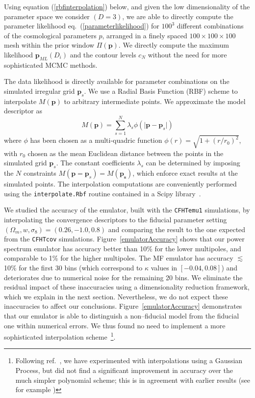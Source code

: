 \documentclass[reprint,aps,prd,superscriptaddress,showkeys,showpacs]{revtex4-1}
\begin{document}
Using equation (\ref{rbfinterpolation}) below, and given the low
dimensionality of the parameter space we consider $(D=3)$, we are able
to directly compute the parameter likelihood
eq.~(\ref{parameterlikelihood}) for $100^3$ different combinations of
the cosmological parameters $p$, arranged in a finely spaced
$100\times100\times100$ mesh within the prior window
$\Pi(\mathbf{p})$. We directly compute the maximum likelihood
$\mathbf{p}_{ML}(D_i)$ and the contour levels $c_N$ without the need
for more sophisticated MCMC methods.

The data likelihood is directly available for parameter combinations
on the simulated irregular grid $\mathbf{p}_s$.  We use a Radial Basis
Function (RBF) scheme to interpolate $M(\mathbf{p})$ to arbitrary
intermediate points.  We approximate the model descriptor as
\begin{equation}
\label{rbfinterpolation}
M(\mathbf{p}) = \sum_{s=1}^N \lambda_s\phi(\vert\mathbf{p}-\mathbf{p}_s\vert)
\end{equation}
%
where $\phi$ has been chosen as a multi-quadric function
$\phi(r)=\sqrt{1+(r/r_0)^2}$, with $r_0$ chosen as the mean Euclidean
distance between the points in the simulated grid $\mathbf{p}_s$. The
constant coefficients $\lambda_s$ can be determined by imposing the
$N$ constraints $M(\mathbf{p}=\mathbf{p}_s)=M(\mathbf{p_s})$, which
enforce exact results at the simulated points. The interpolation
computations are conveniently performed using the
\texttt{interpolate.Rbf} routine contained in a Scipy library~\citep{scipy}.

We studied the accuracy of the emulator, built with the
\texttt{CFHTemu1} simulations, by interpolating the convergence
descriptors to the fiducial parameter setting
$(\Omega_m,w,\sigma_8)=(0.26,-1.0,0.8)$ and comparing the result to
the one expected from the \texttt{CFHTcov}
simulations. Figure~\ref{emulatorAccuracy} shows that our power
spectrum emulator has accuracy better than 10\% for the lower
multipoles, and comparable to 1\% for the higher multipoles. The MF
emulator has accuracy $\lesssim$10\% for the first 30 bins (which
correspond to $\kappa$ values in $[-0.04,0.08]$) and deteriorates due
to numerical noise for the remaining 20 bins. We eliminate the
residual impact of these inaccuracies using a dimensionality reduction
framework, which we explain in the next section. Nevertheless, we do
not expect these inaccuracies to affect our
conclusions. Figure~\ref{emulatorAccuracy} demonstrates that our
emulator is able to distinguish a non--fiducial model from the
fiducial one within numerical errors.  We thus found no need to
implement a more sophisticated interpolation
scheme~\footnote{Following ref.~\citep{coyote2}, we have experimented
  with interpolations using a Gaussian Process, but did not find a
  significant improvement in accuracy over the much simpler polynomial
  scheme; this is in agreement with earlier results (see for example \citep{KnoxGP})}.
\end{document}
